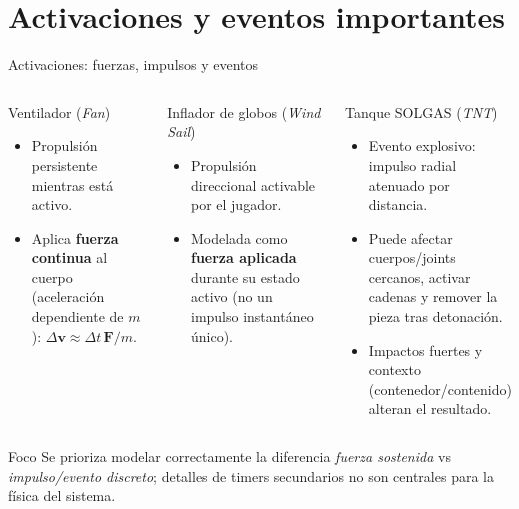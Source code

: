 \documentclass[aspectratio=169,11pt]{beamer}
\begin{document}
\section{Activaciones y eventos importantes}

\begin{frame}{Activaciones: fuerzas, impulsos y eventos}
  \begin{columns}[T]
    \begin{block}{Ventilador (\emph{Fan})}
      \begin{itemize}
        \item Propulsión persistente mientras está activo.
        \item Aplica \textbf{fuerza continua} al cuerpo (aceleración dependiente de $m$): $\Delta\mathbf{v}\approx \Delta t\,\mathbf{F}/m$.
      \end{itemize}
    \end{block}
    \begin{block}{Inflador de globos (\emph{Wind Sail})}
      \begin{itemize}
        \item Propulsión direccional activable por el jugador.
        \item Modelada como \textbf{fuerza aplicada} durante su estado activo (no un impulso instantáneo único).
      \end{itemize}
    \end{block}
    \begin{block}{Tanque SOLGAS (\emph{TNT})}
      \begin{itemize}
        \item Evento explosivo: impulso radial atenuado por distancia.
        \item Puede afectar cuerpos/joints cercanos, activar cadenas y remover la pieza tras detonación.
        \item Impactos fuertes y contexto (contenedor/contenido) alteran el resultado.
      \end{itemize}
    \end{block}
  \end{columns}

  \vspace{0.1cm}
  \begin{alertblock}{Foco}
    Se prioriza modelar correctamente la diferencia \emph{fuerza sostenida} vs \emph{impulso/evento discreto}; detalles de timers secundarios no son centrales para la física del sistema.
  \end{alertblock}
\end{frame}
\end{document}
